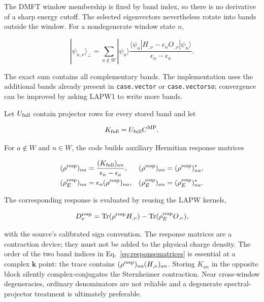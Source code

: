 \documentclass[11pt]{article}
\numberwithin{equation}{section}
\newcommand{\Tr}{\operatorname{Tr}}
\newcommand{\kb}{\mathbf k}
\newcommand{\code}[1]{\texttt{#1}}
\begin{document}
The DMFT window membership is fixed by band index, so there is no derivative
of a sharp energy cutoff.  The selected eigenvectors nevertheless rotate into
bands outside the window.  For a nondegenerate window state $n$,

\begin{equation}
 |\psi_{n,\nu}\rangle_\perp
 =\sum_{a\notin W}|\psi_a\rangle
 \frac{\langle\psi_a|H_{,\nu}-\epsilon_nO_{,\nu}|\psi_n\rangle}
 {\epsilon_n-\epsilon_a}.
 \label{eq:sternheimerbands}
\end{equation}

The exact sum contains all complementary bands.  The implementation uses the
additional bands already present in \code{case.vector} or
\code{case.vectorso}; convergence can be improved by asking LAPW1 to write
more bands.

Let $U_{\rm full}$ contain projector rows for every stored band and let

\begin{equation}
 K_{\rm full}=U_{\rm full}C^{\rm MP}.
\end{equation}

For $a\notin W$ and $n\in W$, the code builds auxiliary Hermitian response
matrices

\begin{align}
 (\rho^{\rm resp})_{na}
 &=\frac{(K_{\rm full})_{an}}{\epsilon_n-\epsilon_a},
 & (\rho^{\rm resp})_{an}&=(\rho^{\rm resp})_{na}^*,\\
 (\rho_E^{\rm resp})_{na}
 &=\epsilon_n(\rho^{\rm resp})_{na},
 & (\rho_E^{\rm resp})_{an}&=(\rho_E^{\rm resp})_{na}^*.
 \label{eq:responsematrices}
\end{align}

The corresponding response is evaluated by reusing the LAPW kernels,

\begin{equation}
 D_\nu^{\rm resp}
 =\Tr(\rho^{\rm resp}H_{,\nu})
 -\Tr(\rho_E^{\rm resp}O_{,\nu}),
 \label{eq:windowresponse}
\end{equation}

with the source's calibrated sign convention.  The response matrices are a
contraction device; they must not be added to the physical charge density.
The order of the two band indices in Eq.~\eqref{eq:responsematrices} is
essential at a complex $\kb$ point: the trace contains
$(\rho^{\rm resp})_{na}(H_{,\nu})_{an}$.  Storing $K_{an}$ in the opposite
block silently complex-conjugates the Sternheimer contraction.
Near cross-window degeneracies, ordinary denominators are not reliable and a
degenerate spectral-projector treatment is ultimately preferable.
\end{document}
